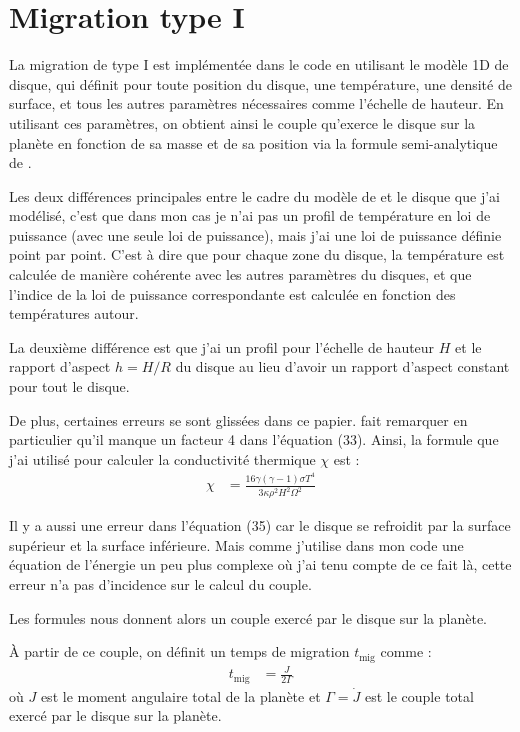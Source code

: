 \section{Migration type I}
La migration de type I est implémentée dans le code en utilisant le modèle 1D de disque, qui définit pour toute position du disque, une température, une densité de surface, et tous les autres paramètres nécessaires comme l'échelle de hauteur. En utilisant ces paramètres, on obtient ainsi le couple qu'exerce le disque sur la planète en fonction de sa masse et de sa position via la formule semi-analytique de \cite{paardekooper2011torque}. 

Les deux différences principales entre le cadre du modèle de \cite{paardekooper2011torque} et le disque que j'ai modélisé, c'est que dans mon cas je n'ai pas un profil de température en loi de puissance (avec une seule loi de puissance), mais j'ai une loi de puissance définie point par point. C'est à dire que pour chaque zone du disque, la température est calculée de manière cohérente avec les autres paramètres du disques, et que l'indice de la loi de puissance correspondante est calculée en fonction des températures autour.

La deuxième différence est que j'ai un profil pour l'échelle de hauteur $H$ et le rapport d'aspect $h=H/R$ du disque au lieu d'avoir un rapport d'aspect constant pour tout le disque.

\bigskip

De plus, certaines erreurs se sont glissées dans ce papier. \cite[appendice A]{bitsch2011range} fait remarquer en particulier qu'il manque un facteur 4 dans l'équation (33). Ainsi, la formule que j'ai utilisé pour calculer la conductivité thermique $\chi$ est :
\begin{align}
\chi &= \frac{16\gamma (\gamma-1) \sigma T^4}{3\kappa \rho^2 H^2\Omega^2}
\end{align}

Il y a aussi une erreur dans l'équation (35) car le disque se refroidit par la surface supérieur et la surface inférieure. Mais comme j'utilise dans mon code une équation de l'énergie  un peu plus complexe où j'ai tenu compte de ce fait là, cette erreur n'a pas d'incidence sur le calcul du couple.

Les formules nous donnent alors un couple exercé par le disque sur la planète. 

À partir de ce couple, on définit un temps de migration $t_\text{mig}$ comme : 
\begin{align}
t_\text{mig} &= \frac{J}{2\Gamma}
\end{align}
où $J$ est le moment angulaire total de la planète et $\Gamma=\dot{J}$ est le couple total exercé par le disque sur la planète.

